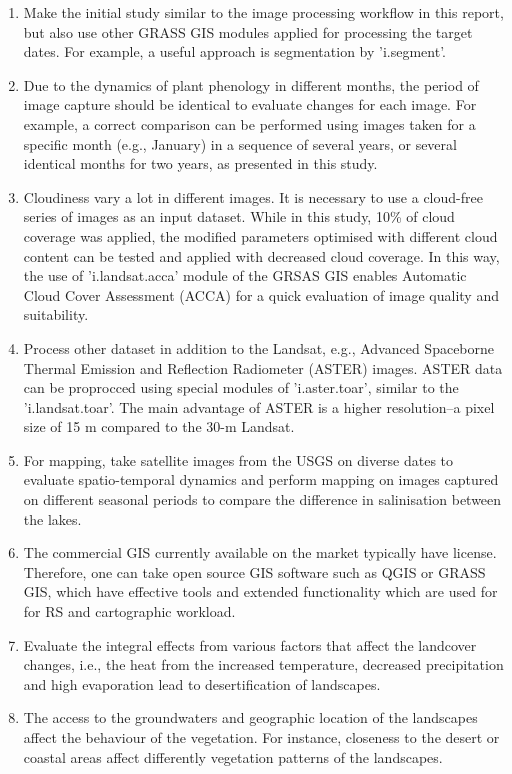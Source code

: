 \documentclass[land,article,submit,pdftex,moreauthors]{Definitions/mdpi}
\begin{document}
\begin{enumerate}
	\item Make the initial study similar to the image processing workflow in this report, but also use other GRASS GIS modules applied for processing the target dates. For example, a useful approach is segmentation by 'i.segment'.
	\item Due to the  dynamics of plant phenology in different months, the period of image capture should be identical to evaluate changes for each image. For example, a correct comparison can be performed using images taken for a specific month (e.g., January) in a sequence of several years, or several identical months for two years, as presented in this study.
	\item Cloudiness vary a lot in different images. It is necessary to use a cloud-free series of images as an input dataset. While in this study, 10\% of cloud coverage was applied, the modified parameters optimised with different cloud content can be tested and applied with decreased cloud coverage. In this way, the use of 'i.landsat.acca' module of the GRSAS GIS enables Automatic Cloud Cover Assessment (ACCA) for a quick evaluation of image quality and suitability.
	\item Process other dataset in addition to the Landsat, e.g., Advanced Spaceborne Thermal Emission and Reflection Radiometer (ASTER) images. ASTER data can be proprocced using special modules of 'i.aster.toar', similar to the 'i.landsat.toar'. The main advantage of ASTER is a higher resolution--a pixel size of 15 m compared to the 30-m Landsat. 
	\item For mapping, take satellite images from the USGS on diverse dates to evaluate spatio-temporal dynamics and perform mapping on images captured on different seasonal periods to compare the difference in salinisation between the lakes.
	\item The  commercial GIS currently available on the market typically have license. Therefore, one can take open source GIS software such as QGIS or GRASS GIS, which have effective tools and extended functionality which are used for for RS and cartographic workload.
	\item Evaluate the integral effects from various factors that affect the landcover changes, i.e., the heat from the increased temperature, decreased precipitation and high evaporation lead to desertification of landscapes. 
	\item The access to the groundwaters and geographic location of the landscapes affect the behaviour of the vegetation. For instance, closeness to the desert or coastal areas affect differently vegetation patterns of the landscapes. 

\end{enumerate}
\end{document}
